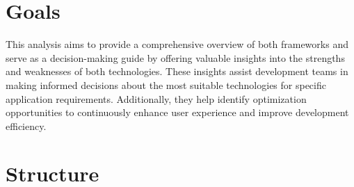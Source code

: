 \section{Goals}
This analysis aims to provide a comprehensive overview of both frameworks and serve as a decision-making guide by offering valuable insights into the strengths and weaknesses of both technologies. 
These insights assist development teams in making informed decisions about the most suitable technologies for specific application requirements. Additionally, they help identify optimization opportunities to continuously enhance user experience and improve development efficiency.

\section{Structure}
